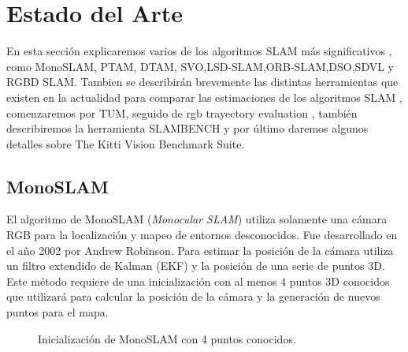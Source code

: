 \chapter{Estado del Arte} \label{cap:Estado del Arte}

En esta sección explicaremos varios de los algoritmos SLAM más significativos , como MonoSLAM, PTAM, DTAM, SVO,LSD-SLAM,ORB-SLAM,DSO,SDVL y RGBD SLAM.
Tambien se describirán brevemente las distintas herramientas que existen en la actualidad para comparar las estimaciones de los algoritmos SLAM , comenzaremos por TUM, seguido de rgb trayectory evaluation , también describiremos la herramienta SLAMBENCH y por último daremos algunos detalles sobre The Kitti Vision Benchmark Suite.


\section{MonoSLAM}
El algoritmo de  MonoSLAM (\textit{Monocular SLAM}) \cite{Davison2007monoslam} utiliza solamente una cámara RGB para la localización y mapeo de entornos desconocidos. Fue desarrollado en el año 2002  por Andrew Robinson. Para estimar la posición de la cámara utiliza un filtro extendido de Kalman (EKF) y la posición de una serie de puntos 3D. Este método requiere de una inicialización con al menos 4 puntos 3D conocidos que utilizará para calcular la posición de la cámara y la generación de nuevos puntos para el mapa.
\begin{figure}[H]
\begin{center}
\end{center}
\caption{Inicialización de MonoSLAM con 4 puntos conocidos.}
\end{figure}

